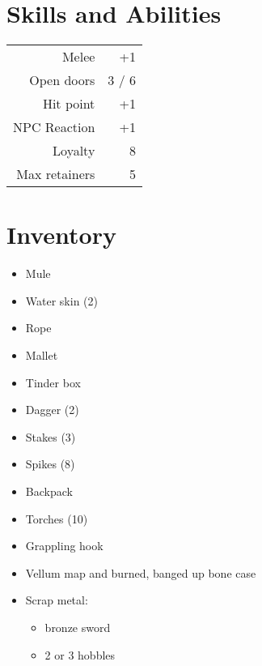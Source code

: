\documentclass[a4paper]{article}
\begin{document}
\begin{multicols}{2}
\section{Skills and Abilities}
\begin{table}[H]
    \begin{tabular}{r|r} %
      Melee & +1\\
      Open doors & 3 / 6\\
      Hit point & +1\\
      NPC Reaction & +1\\
      Loyalty & 8\\
      Max retainers & 5\\
    \end{tabular}
\end{table}

\section{Inventory}
\begin{itemize}[nosep, itemindent=1em, label= ]
  \item Mule
  \item Water skin (2)
  \item Rope
  \item Mallet
  \item Tinder box
  \item Dagger (2)
  \item Stakes (3)
  \item Spikes (8)
  \item Backpack
  \item Torches (10)
  \item Grappling hook
  \item Vellum map and burned, banged up bone case
  \item Scrap metal:
    \begin{itemize}[nosep, itemindent=1em, label=-]
      \item bronze sword
      \item 2 or 3 hobbles
  \end{itemize}
\end{itemize}


\end{multicols}
\end{document}

